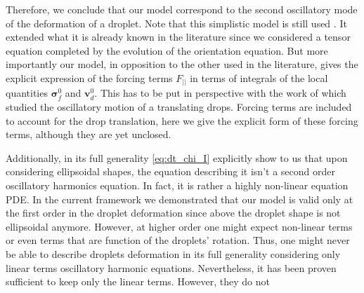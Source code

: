 Therefore, we conclude that our model correspond to the second oscillatory mode of the deformation of a droplet. 
Note that this simplistic model is still used \citep{riviere2021sub}. 
It extended what it is already known in the literature since we considered a tensor equation completed by the evolution of the orientation equation. 
But more importantly our model, in opposition to the other used in the literature, gives the explicit expression of the forcing terms $F_{||}$ in terms of integrals of the local quantities $\bm\sigma_f^0$ and $\textbf{v}_d^0$.
This has to be put in perspective with the work of \citet{lalanne2013effect} which studied the oscillatory motion of a translating drops.
Forcing terms are included to account for the drop translation, here we give the explicit form of these forcing terms, although they are yet unclosed.  

Additionally, in its full generality \ref{eq:dt_chi_I} explicitly show to us that upon considering ellipsoidal shapes, the equation describing it isn't a second order oscillatory harmonics equation. 
In fact, it is rather a highly non-linear equation PDE. 
In the current framework we demonstrated that our model is valid only at the first order in the droplet deformation since above the droplet shape is not ellipsoidal anymore. 
However, at higher order one might expect non-linear terms or even terms that are function of the droplets' rotation. 
Thus, one might never be able to describe droplets deformation in its full generality considering only linear terms oscillatory harmonic equations. 
Nevertheless, it has been proven sufficient to keep only the linear terms. 
However, they do not